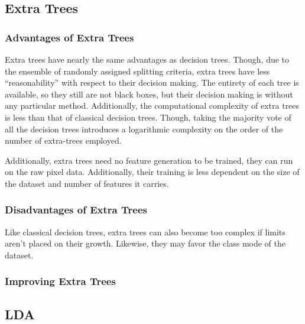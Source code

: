 \subsection{Extra Trees}
\subsubsection{Advantages of Extra Trees}

Extra trees have nearly the same advantages as decision trees. Though, due to the ensemble of randomly assigned splitting criteria, extra trees have less ``reasonability'' with respect to their decision making. The entirety of each tree is available, so they still are not black boxes, but their decision making is without any particular method. Additionally, the computational complexity of extra trees is less than that of classical decision trees. Though, taking the majority vote of all the decision trees introduces a logarithmic complexity on the order of the number of extra-trees employed. 

Additionally, extra trees need no feature generation to be trained, they can run on the raw pixel data. Additionally, their training is less dependent on the size of the dataset and number of features it carries.

\subsubsection{Disadvantages of Extra Trees}

Like classical decision trees, extra trees can also become too complex if limits aren't placed on their growth. Likewise, they may favor the class mode of the dataset. 

\subsubsection{Improving Extra Trees}



\subsection{LDA}
